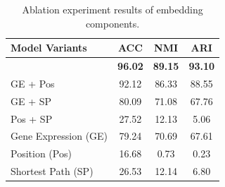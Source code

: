 \begin{table}[t]
\centering


\small
\begin{tabular}{lccc}
\toprule
\textbf{Model Variants} & \textbf{ACC} & \textbf{NMI} & \textbf{ARI} \\
\midrule
\textbf{\method{}} & \textbf{96.02} & \textbf{89.15} & \textbf{93.10} \\
GE + Pos & 92.12 & 86.33 & 88.55 \\
GE + SP & 80.09 & 71.08 & 67.76 \\
Pos + SP & 27.52 & 12.13 & 5.06 \\
\midrule
Gene Expression (GE) & 79.24 & 70.69 & 67.61 \\
Position (Pos) & 16.68 & 0.73 & 0.23 \\
Shortest Path (SP) & 26.53 & 12.14 & 6.80 \\
\bottomrule
\end{tabular}
\caption{Ablation experiment results of embedding components.}
\label{tab:ablation_embed}
\end{table}